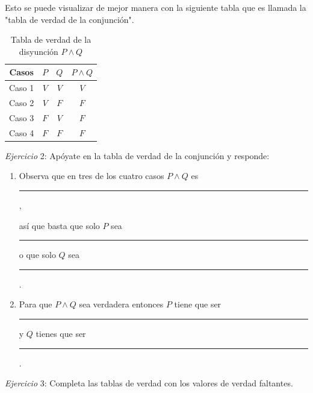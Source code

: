 \documentclass[letterpaper, twoside]{article}
\begin{document}
\vspace{.5cm}

Esto se puede visualizar de mejor manera con la siguiente tabla que es llamada la "tabla de verdad de la conjunción".

\begin{table}[h]
  \centering
  \begin{tabular}{|c|c|c|c|}
    \hline
    Casos  & $P$ & $Q$ & $P\land Q$ \\ \hline
    Caso 1 & $V$ & $V$ & $V$ \\ \hline
    Caso 2 & $V$ & $F$ & $F$ \\ \hline
    Caso 3 & $F$ & $V$ & $F$ \\ \hline
    Caso 4 & $F$ & $F$ & $F$ \\ \hline 
  \end{tabular}
  \caption*{Tabla de verdad de la disyunción $P\land Q$}
\end{table}

\newpage

\textit{Ejercicio} 2: Apóyate en la tabla de verdad de la conjunción y responde:

\begin{enumerate}
  \item Observa que en tres de los cuatro casos $P\land Q$ es \rule{5cm}{.02cm},\par así que basta que solo $P$ sea \rule{4cm}{.02cm} o que solo $Q$ sea \rule{4cm}{.02cm}.
  \item Para que $P\land Q$ sea verdadera entonces $P$ tiene que ser \rule{5cm}{.02cm} y $Q$ tienes que ser \rule{5cm}{.02cm}.
\end{enumerate}

\vspace{1cm}

\textit{Ejercicio} 3: Completa las tablas de verdad con los valores de verdad faltantes.

\vspace{.5cm}
\end{document}
